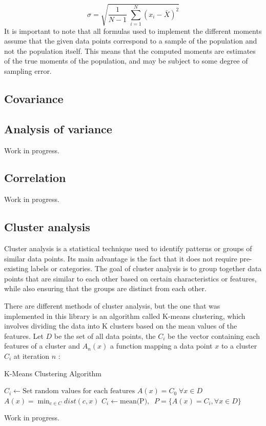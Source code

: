 \documentclass{book}
\begin{document}
\begin{equation}
    \sigma = \sqrt{\frac{1}{N - 1} \; \sum_{i=1}^{N} (x_i - \bar{X})^2}
\end{equation}
It is important to note that all formulas used to implement the different moments assume that the given data points correspond to a sample of the population and not the population itself. This means that the computed moments are estimates of the true moments of the population, and may be subject to some degree of sampling error.

\subsection{Covariance}

\subsection{Analysis of variance}

Work in progress.
\subsection{Correlation}

Work in progress.
\subsection{Cluster analysis}

Cluster analysis is a statistical technique used to identify patterns or groups of similar data points. Its main advantage is the fact that it does not require pre-existing labels or categories. The goal of cluster analysis is to group together data points that are similar to each other based on certain characteristics or features, while also ensuring that the groups are distinct from each other.

There are different methods of cluster analysis, but the one that was implemented in this library is an algorithm called K-means clustering, which involves dividing the data into K clusters based on the mean values of the features. Let $D$ be the set of all data points, the $C_i$ be the vector containing each features of a cluster and $A_{n}(x)$ a function mapping a data point $x$ to a cluster $C_i$ at iteration $n$ :
\begin{algorithm}
  \caption{K-Means Clustering Algorithm}
  \begin{algorithmic}[1]
        \State $C_i \gets \text{Set random values for each features}$
    \EndFor
    \State $A(x) = C_0\; \forall x \in D$
            \State $A(x) = \min_{c \in C} dist(c, x)$
        \EndFor
            \State $C_i \gets \text{mean(P)}, \; \; P = \{ A(x) = C_i, \forall x \in D \}$
        \EndFor
    \EndWhile
  \end{algorithmic}
\end{algorithm}
Work in progress.
\end{document}
